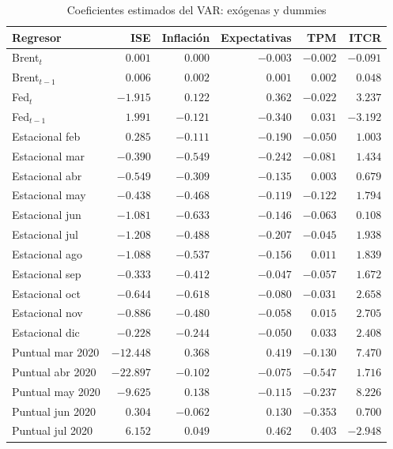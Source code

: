 \begin{table}[H]
\centering
\caption{Coeficientes estimados del VAR: exógenas y dummies}
\label{tab:coeficientes_exogenas}
\footnotesize
\begin{tabular}{@{}lrrrrr@{}}
\toprule
Regresor & ISE & Inflación & Expectativas & TPM & ITCR \\
\midrule
Brent$_t$ & $0.001$ & $0.000$ & $-0.003$ & $-0.002$ & $-0.091$ \\
Brent$_{t-1}$ & $0.006$ & $0.002$ & $0.001$ & $0.002$ & $0.048$ \\
Fed$_t$ & $-1.915$ & $0.122$ & $0.362$ & $-0.022$ & $3.237$ \\
Fed$_{t-1}$ & $1.991$ & $-0.121$ & $-0.340$ & $0.031$ & $-3.192$ \\
\addlinespace
Estacional feb & $0.285$ & $-0.111$ & $-0.190$ & $-0.050$ & $1.003$ \\
Estacional mar & $-0.390$ & $-0.549$ & $-0.242$ & $-0.081$ & $1.434$ \\
Estacional abr & $-0.549$ & $-0.309$ & $-0.135$ & $0.003$ & $0.679$ \\
Estacional may & $-0.438$ & $-0.468$ & $-0.119$ & $-0.122$ & $1.794$ \\
Estacional jun & $-1.081$ & $-0.633$ & $-0.146$ & $-0.063$ & $0.108$ \\
Estacional jul & $-1.208$ & $-0.488$ & $-0.207$ & $-0.045$ & $1.938$ \\
Estacional ago & $-1.088$ & $-0.537$ & $-0.156$ & $0.011$ & $1.839$ \\
Estacional sep & $-0.333$ & $-0.412$ & $-0.047$ & $-0.057$ & $1.672$ \\
Estacional oct & $-0.644$ & $-0.618$ & $-0.080$ & $-0.031$ & $2.658$ \\
Estacional nov & $-0.886$ & $-0.480$ & $-0.058$ & $0.015$ & $2.705$ \\
Estacional dic & $-0.228$ & $-0.244$ & $-0.050$ & $0.033$ & $2.408$ \\
\addlinespace
Puntual mar 2020 & $-12.448$ & $0.368$ & $0.419$ & $-0.130$ & $7.470$ \\
Puntual abr 2020 & $-22.897$ & $-0.102$ & $-0.075$ & $-0.547$ & $1.716$ \\
Puntual may 2020 & $-9.625$ & $0.138$ & $-0.115$ & $-0.237$ & $8.226$ \\
Puntual jun 2020 & $0.304$ & $-0.062$ & $0.130$ & $-0.353$ & $0.700$ \\
Puntual jul 2020 & $6.152$ & $0.049$ & $0.462$ & $0.403$ & $-2.948$ \\

\end{tabular}
\end{table}
